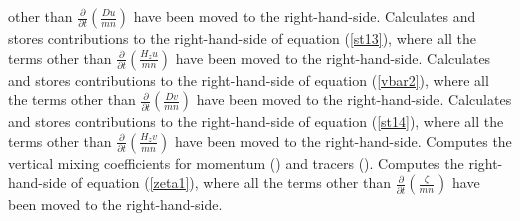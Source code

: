 \begin{klist}
other than $\frac{\partial}{\partial t} (\frac{Du}{mn})$
have been moved to the right-hand-side.
       Calculates and stores contributions
to the right-hand-side of equation (\ref{st13}), where all the terms
other than $\frac{\partial}{\partial t} (\frac{H_zu}{mn})$
have been moved to the right-hand-side.
       Calculates and stores contributions
to the right-hand-side of equation (\ref{vbar2}), where all the terms
other than $\frac{\partial}{\partial t} (\frac{Dv}{mn})$
have been moved to the right-hand-side.
       Calculates and stores contributions
to the right-hand-side of equation (\ref{st14}), where all the terms
other than $\frac{\partial}{\partial t} (\frac{H_zv}{mn})$
have been moved to the right-hand-side.
   Computes the vertical mixing coefficients
for momentum () and tracers ().
     Computes the right-hand-side of
equation (\ref{zeta1}), where all the terms
other than $\frac{\partial}{\partial t} (\frac{\zeta}{mn})$
have been moved to the right-hand-side.
\end{klist}

